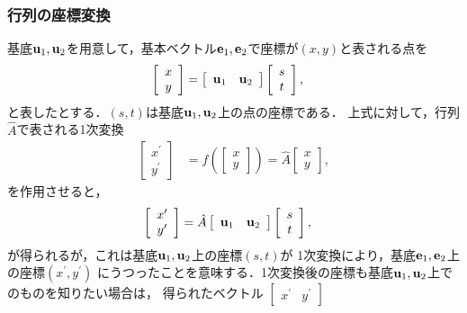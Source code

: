 \subsubsection{行列の座標変換}
%
基底${\bf u}_{1},{\bf u}_{2}$を用意して，基本ベクトル${\bf e}_{1},{\bf e}_{2}$で座標が$(x,y)$と表される点を
\begin{align}
\left[\begin{array}{c}
x\\
y
\end{array}\right] & =\left[\begin{array}{cc}
{\bf u}_{1} & {\bf u}_{2}\end{array}\right]\left[\begin{array}{c}
s\\
t
\end{array}\right],
\end{align}
と表したとする．$(s,t)$は基底${\bf u}_{1},{\bf u}_2$上の点の座標である．
上式に対して，行列$\hat{A}$で表される1次変換
%
\begin{align}
\left[\begin{array}{c}
x^{\prime}\\
y^{\prime}
\end{array}\right] 
& =f\left(\left[\begin{array}{c}
x\\
y
\end{array}\right]\right)=\hat{A}\left[\begin{array}{c}
x\\
y
\end{array}\right],
\end{align}
%
を作用させると，
%
\begin{align}
\left[\begin{array}{c}
x^{\prime}\\
y^{\prime}
\end{array}\right] & =\hat{A}\left[\begin{array}{cc}
{\bf u}_{1} & {\bf u}_{2}\end{array}\right]\left[\begin{array}{c}
s\\
t
\end{array}\right],
\end{align}
が得られるが，これは基底${\bf u}_{1},{\bf u}_{2}$上の座標$(s,t)$が
1次変換により，基底${\bf e}_{1},{\bf e}_{2}$上の座標$(x^{\prime},y^{\prime})$
にうつったことを意味する．1次変換後の座標も基底${\bf u}_{1},{\bf u}_{2}$上でのものを知りたい場合は，
得られたベクトル
$[\begin{array}{cc}
x^{\prime} &
y^{\prime}
\end{array}]$ 
